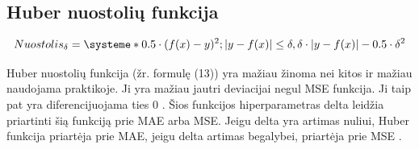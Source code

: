 \documentclass{VUMIFInfKursinis}
\begin{document}
\subsection{Huber nuostolių funkcija}
\begin{equation}
  Nuostolis_{\delta} = \systeme*{
 0.5\cdot(f(x) - y)^2; \abs{y - f(x)} \leq \delta,
 \delta \cdot \abs{y - f(x)} - 0.5 \cdot \delta^2
                       }
\end{equation}
\par
Huber nuostolių funkcija (žr. formulę (13)) yra mažiau žinoma nei kitos ir mažiau naudojama
praktikoje. Ji yra mažiau jautri deviacijai negul MSE funkcija.
Ji taip pat yra diferencijuojama ties 0 \cite{salt12}.
Šios funkcijos hiperparametras delta leidžia priartinti šią
funkciją prie MAE arba MSE. Jeigu delta yra artimas nuliui,
Huber funkcija priartėja prie MAE, jeigu delta artimas begalybei, priartėja prie MSE \cite{salt12}.

\end{document}

